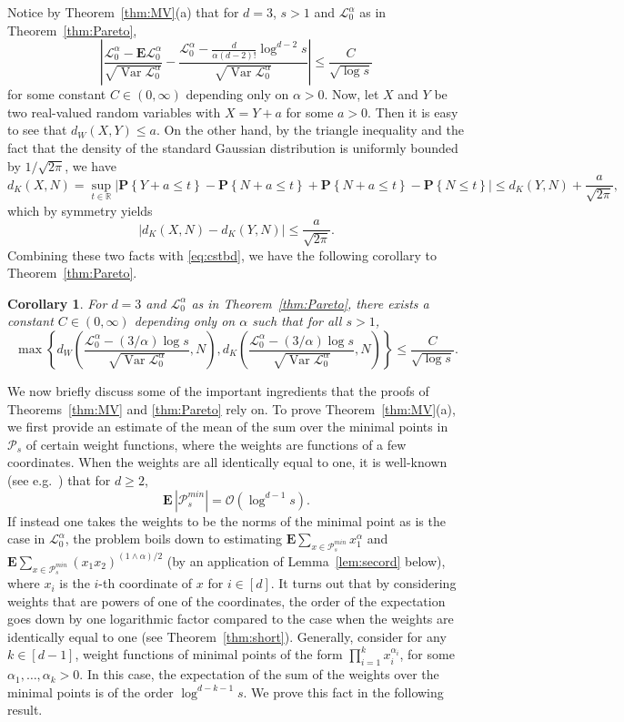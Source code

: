 \documentclass[11pt,reqno]{amsart}
\numberwithin{equation}{section}
\newtheorem{corollary}[theorem]{Corollary}
\theoremstyle{definition}
\newcommand{\E}{\mathbf{E}}
\newcommand{\R}{\mathbb{R}}
\newcommand{\sP}{\mathcal{P}}
\newcommand{\Prob}[1]{\mathbf P\left\{#1\right\}}
\DeclareMathOperator{\Var}{Var}
\begin{document}
Notice by Theorem~\ref{thm:MV}(a) that for $d= 3$, $s > 1$ and $\mathscr{L}_0^{\alpha}$ as in Theorem~\ref{thm:Pareto},
\begin{equation}\label{eq:cstbd}
\left|\frac{\mathscr{L}_0^{\alpha} - \E \mathscr{L}_0^{\alpha}}{\sqrt{\Var
		\mathscr{L}_0^{\alpha}}} - \frac{\mathscr{L}_0^{\alpha} -  \frac{d}{\alpha (d-2)!} \log^{d-2} s}{\sqrt{\Var
		\mathscr{L}_0^{\alpha}}} \right| \le \frac{C}{\sqrt{\log s}}
\end{equation}
for some constant $C \in (0,\infty)$ depending only on $\alpha>0$. Now, let $X$ and $Y$ be two real-valued random variables with $X=Y+a$ for some $a>0$. Then it is easy to see that
$
d_W(X,Y) \le a.
$
On the other hand, by the triangle inequality and the fact that the density of the standard Gaussian distribution is uniformly bounded by $1/\sqrt{2\pi}$, we have
$$
d_K(X,N)= \sup_{t \in \R} |\Prob{Y+a \le t} - \Prob{N +a\le t} + \Prob{N +a\le t} -\Prob{N \le t}| \le d_K(Y,N) + \frac{a}{\sqrt{2\pi}},
$$
which by symmetry yields
$$
|d_K(X,N) - d_K(Y,N)| \le \frac{a}{\sqrt{2\pi}}.
$$
Combining these two facts with \eqref{eq:cstbd}, we have the following corollary to Theorem~\ref{thm:Pareto}.

\begin{corollary} For $d =3$ and $\mathscr{L}_0^{\alpha}$ as in Theorem~\ref{thm:Pareto}, there exists a constant $C \in (0,\infty)$ depending only on $\alpha$ such that for all $s>1$,
	$$
	\max \left\{d_W\left(\frac{\mathscr{L}_0^{\alpha} - (3/\alpha) \log s}{\sqrt{\Var
			\mathscr{L}_0^{\alpha}}},N\right), d_K\left(\frac{\mathscr{L}_0^{\alpha} - (3/\alpha) \log s}{\sqrt{\Var
			\mathscr{L}_0^{\alpha}}},N\right) \right\} \le
	\frac{C}{\sqrt{\log s}}.
	$$
\end{corollary}

We now briefly discuss some of the important ingredients that the proofs of Theorems~\ref{thm:MV} and \ref{thm:Pareto} rely on. To prove Theorem~\ref{thm:MV}(a), we first provide an estimate of the mean of the sum over the minimal points in $\sP_s$ of certain weight functions, where the weights are functions of a few coordinates. When the weights are all identically equal to one, it is well-known (see e.g.\ \cite{BDHT05}) that for $d \ge 2$,
$$
\E\, |\sP_s^{min}|=\mathcal{O}(\log^{d-1} s).
$$
 If instead one takes the weights to be the norms of the minimal point as is the case in $\mathscr{L}_0^{\alpha}$, the problem boils down to estimating $\E \sum_{x \in \sP_s^{min}} x_1^\alpha$ and $\E \sum_{x \in \sP_s^{min}} (x_1 x_2)^{(1 \wedge \alpha)/2}$ (by an application of Lemma~\ref{lem:secord} below), where $x_i$ is the $i$-th coordinate of $x$ for $i \in [d]$. It turns out that by considering weights that are powers of one of the coordinates, the order of the expectation goes down by one logarithmic factor compared to the case when the weights are identically equal to one (see Theorem~\ref{thm:short}). Generally, consider for any $k \in [d-1]$, weight functions of minimal points of the form $\prod_{i=1}^k x_i^{\alpha_i}$, for some $\alpha_1,\dots, \alpha_k>0$. In this case, the expectation of the sum of the weights  over the minimal points is of the order $\log^{d-k-1} s$. We prove this fact in the following result. 
\end{document}
